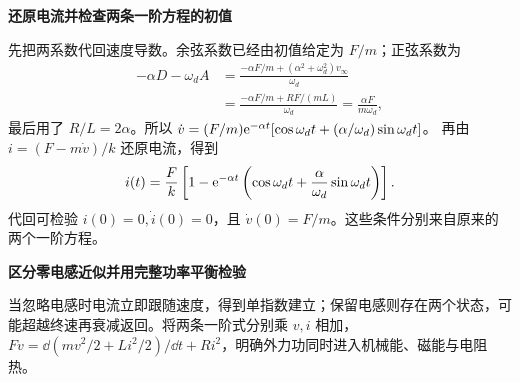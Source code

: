 \begin{solution}
\par\medskip{}\noindent\textbf{还原电流并检查两条一阶方程的初值}\par\nobreak
先把两系数代回速度导数。余弦系数已经由初值给定为 $F/m$；正弦系数为
\[
 \begin{aligned}
 -\alpha D-\omega_dA
 &=\frac{-\alpha F/m+(\alpha^2+\omega_d^2)v_\infty}{\omega_d}\\
 &=\frac{-\alpha F/m+RF/(mL)}{\omega_d}
 =\frac{\alpha F}{m\omega_d},
 \end{aligned}
\]
最后用了 $R/L=2\alpha$。所以
$\dot v=(F/m)\mathrm e^{-\alpha t}[\cos\omega_dt+(\alpha/\omega_d)\sin\omega_dt]$。
再由 $i=(F-m\dot v)/k$ 还原电流，得到
\[i(t)=\frac Fk\left[1-\mathrm e^{-\alpha t}\left(\cos\omega_dt+\frac\alpha{\omega_d}\sin\omega_dt\right)\right].\]
代回可检验 $i(0)=0,\dot i(0)=0$，且 $\dot v(0)=F/m$。这些条件分别来自原来的两个一阶方程。


\par\medskip{}\noindent\textbf{区分零电感近似并用完整功率平衡检验}\par\nobreak
当忽略电感时电流立即跟随速度，得到单指数建立；保留电感则存在两个状态，可能超越终速再衰减返回。将两条一阶式分别乘 $v,i$ 相加，$Fv=\dd(mv^2/2+Li^2/2)/\dd t+Ri^2$，明确外力功同时进入机械能、磁能与电阻热。\end{solution}
